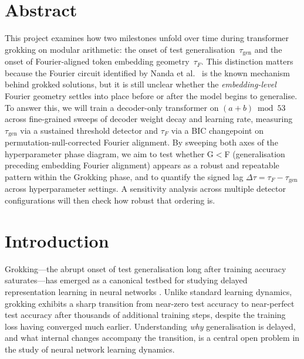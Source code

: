 \documentclass[12pt,openany,a4paper]{book}
\newcommand{\taug}{\tau_{\mathrm{gen}}}
\newcommand{\tauf}{\tau_{F}}
\newcommand{\Dtau}{\Delta\tau}
\begin{document}
\chapter{Abstract}

This project examines how two milestones unfold over time during transformer grokking on modular arithmetic:
the onset of test generalisation~$\taug$ and the onset of
Fourier-aligned token embedding geometry~$\tauf$.
This distinction matters because the Fourier circuit identified by Nanda et al.\ \cite{nanda2023progress} is the known mechanism behind grokked solutions, but it is still unclear whether the \emph{embedding-level} Fourier geometry settles into place before or after the model begins to generalise.
To answer this, we will train a decoder-only transformer on $(a+b)\bmod 53$ across fine-grained sweeps of decoder weight decay and learning rate,
measuring $\taug$ via a sustained threshold detector and $\tauf$ via a
BIC changepoint on permutation-null-corrected Fourier alignment.
By sweeping both axes of the hyperparameter phase diagram, we aim to test whether G$<$F (generalisation preceding embedding Fourier alignment) appears as a robust and repeatable pattern within the Grokking phase, and to quantify the signed lag $\Dtau = \tauf - \taug$ across hyperparameter settings.
A sensitivity analysis across multiple detector configurations will then check how robust that ordering is.

\tableofcontents

\listoffigures
{}

\listoftables
{}

\cleardoublepage
\mainmatter

\chapter{Introduction}

Grokking---the abrupt onset of test generalisation long after training
accuracy saturates---has emerged as a canonical testbed for studying
delayed representation learning in neural networks
\cite{power2022grokking}.
Unlike standard learning dynamics, grokking exhibits a sharp transition
from near-zero test accuracy to near-perfect test accuracy after
thousands of additional training steps, despite the training loss
having converged much earlier.
Understanding \emph{why} generalisation is delayed, and what internal
changes accompany the transition, is a central open problem in the
study of neural network learning dynamics.
\end{document}
